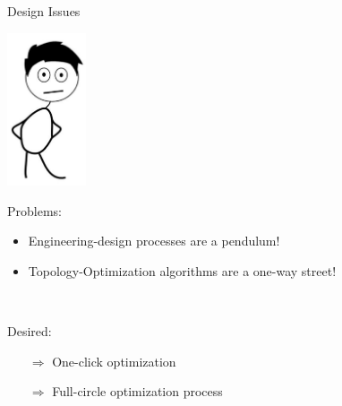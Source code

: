 \begin{frame}{Design Issues}
	
	\includegraphics[width=0.175\textwidth, center]{Pictures/animations/animation_designer_sad}
	
	\begin{multicols}{2}
		\begin{block}{Problems:}{
		\begin{itemize}		
			\item Engineering-design processes are a pendulum!
			\item Topology-Optimization algorithms are a one-way street!
		\end{itemize}~\\
		}
		\end{block}
		\columnbreak

		\begin{block}{Desired:}{
		\begin{itemize}		
			\item[$\Rightarrow$] One-click optimization
		\end{itemize}
		\begin{itemize}		
			\item[$\Rightarrow$] Full-circle optimization process	
		\end{itemize}
		}
		\end{block}
				
		\end{multicols}

\end{frame}	

